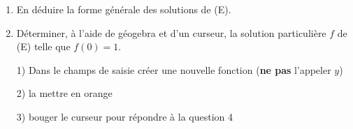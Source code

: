 \begin{enumerate}
\begin{methode}{}
	4) mettre la courbe de $g$ en rouge
	
	5) Dans le champs de saisie, taper : \verb|d(x)= -5*exp(-2x)| {\it \footnotesize (la partie droite de E)}
	
	6) mettre $d$ en bleu
	
	7) faire bouger les curseurs (au besoin, changer les paramètres) pour faire correspondre la courbe rouge avec la courbe bleue {\it \footnotesize (donc la partie gauche avec la partie droite de E)}
	\end{methode}
\medskip

	\item En déduire la forme générale des solutions de (E).
	
	
\begin{blocvisiblex}[height=1.5]
    {
\quad
	}
\end{blocvisiblex}

	\medskip

	\item Déterminer, à l'aide de géogebra et d'un curseur, la solution particulière $f$ de (E) telle que $f(0)=1$.
	


\begin{blocvisiblex}[height=1.5]
    {
\quad
	}
\end{blocvisiblex}

	\begin{methode}{}
	1) Dans le champs de saisie créer une nouvelle fonction ({\bf ne pas} l'appeler $y$)
	
	2) la mettre en orange	
	
	3) bouger le curseur pour répondre à la question 4
	\end{methode}

\end{enumerate}

\medskip

